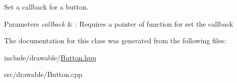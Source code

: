 Set a callback for a button. 


\begin{DoxyParams}{Parameters}
{\em callback} & \+: Requires a pointer of function for set the callback \\
\hline
\end{DoxyParams}


The documentation for this class was generated from the following files\+:\begin{DoxyCompactItemize}
\item 
include/drawable/\hyperlink{Button_8hpp}{Button.\+hpp}\item 
src/drawable/Button.\+cpp\end{DoxyCompactItemize}
